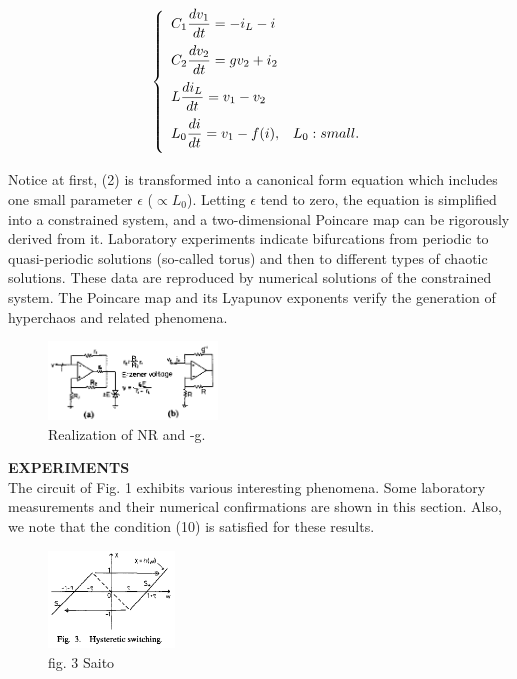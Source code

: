 \documentclass[%
 reprint,
 amsmath,amssymb,
 aps,
]{revtex4-2}
\begin{document}
\begin{equation}
        \left\{
        	\begin{array}{ll} 
           \vspace{2mm}
           C_{1}\dfrac{dv_{1}}{dt}=-i_{L}-i\\
           \vspace{2mm}
           C_{2}\dfrac{dv_{2}}{dt}=gv_{2}+i_{2}\\
           \vspace{2mm}
           L\dfrac{di_{L}}{dt}=v_{1}-v_{2}\\
           \vspace{2mm}
           L_{0}\dfrac{di}{dt}=v_{1}-f(i), & L_{0}:small.
        	\end{array}
        \right.
\end{equation}

Notice at first, (2) is transformed into a canonical form equation which includes one small parameter $\epsilon$ ($\propto L_0$).
Letting $\epsilon$ tend to zero, the equation is simplified into a constrained system, and a two-dimensional Poincare map can be rigorously derived from it. Laboratory experiments indicate bifurcations from periodic to quasi-periodic solutions (so-called torus) and then to different types of chaotic solutions. These data are reproduced by numerical solutions of the constrained system. The Poincare map and its Lyapunov exponents verify the generation of hyperchaos and related phenomena.

\begin{figure}[h!]
    \centering
    \includegraphics[width=0.4\textwidth]{Saito/fig. 2 saito.png}
    \caption{Realization of NR and -g.}
    \label{fig2:saito}
\end{figure}
\vspace{5mm}
\textbf{EXPERIMENTS}\\
The circuit of Fig. 1 exhibits various interesting phenomena. Some laboratory measurements and their numerical confirmations are shown in this section. Also, we note that the condition (10) is satisfied for these results.

\begin{figure}[h]
    \centering
    \includegraphics[width=0.3\textwidth]{Saito/fig. 3 Saito.png}
    \caption{fig. 3 Saito}
    \label{fig.3:saito}
\end{figure}
\end{document}
